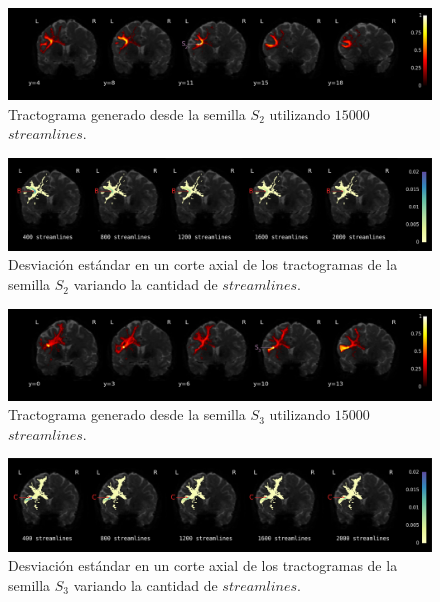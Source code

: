 \begin{figure}[h!]
   \centering
    \includegraphics[width=\textwidth]{img/m2.png}
    \caption{Tractograma generado desde la semilla $S_2$ utilizando $15000$
             $streamlines$.}
    \label{fig:m2}
\end{figure}

\begin{figure}[h!]
   \centering
    \includegraphics[width=\textwidth]{img/s2.png}
    \caption{Desviaci\'on est\'andar en un corte axial de los tractogramas
             de la semilla $S_2$ variando la cantidad de $streamlines$.}
    \label{fig:s2}
\end{figure}

\begin{figure}[h!]
   \centering
    \includegraphics[width=\textwidth]{img/m3.png}
    \caption{Tractograma generado desde la semilla $S_3$ utilizando $15000$
             $streamlines$.}
    \label{fig:m3}
\end{figure}

\begin{figure}[h!]
   \centering
    \includegraphics[width=\textwidth]{img/s3.png}
    \caption{Desviaci\'on est\'andar en un corte axial de los tractogramas
             de la semilla $S_3$ variando la cantidad de $streamlines$.}
    \label{fig:s3}
\end{figure}

